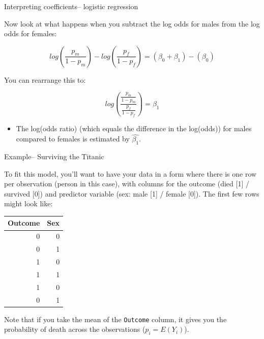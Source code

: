 \documentclass[ignorenonframetext,]{beamer}
\providecommand{\tightlist}{%
  \setlength{\itemsep}{0pt}\setlength{\parskip}{0pt}}
\begin{document}
\begin{frame}{Interpreting coefficients-- logistic regression}

Now look at what happens when you subtract the log odds for males from
the log odds for females:

\[
log(\frac{p_m}{1 - p_m}) - log(\frac{p_f}{1 - p_f}) = (\beta_0 + \beta_1) - (\beta_0)
\]

You can rearrange this to:

\[
log\left(\frac{\frac{p_m}{1-p_m}}{\frac{p_f}{1-p_f}}\right) = \beta_1
\]

\begin{itemize}
\tightlist
\item
  The log(odds ratio) (which equals the difference in the log(odds)) for
  males compared to females is estimated by \(\hat{\beta_1}\).
\end{itemize}

\end{frame}

\begin{frame}[fragile]{Example-- Surviving the Titanic}

To fit this model, you'll want to have your data in a form where there
is one row per observation (person in this case), with columns for the
outcome (died {[}1{]} / survived {[}0{]}) and predictor variable (sex:
male {[}1{]} / female {[}0{]}). The first few rows might look like:

\begin{longtable}[]{@{}rr@{}}
\toprule
Outcome & Sex\tabularnewline
\midrule
\endhead
0 & 0\tabularnewline
0 & 1\tabularnewline
1 & 0\tabularnewline
1 & 1\tabularnewline
1 & 0\tabularnewline
0 & 1\tabularnewline
\bottomrule
\end{longtable}

\footnotesize

Note that if you take the mean of the \texttt{Outcome} column, it gives
you the probability of death across the observations (\(p_i = E(Y_i)\)).

\end{frame}
\end{document}
